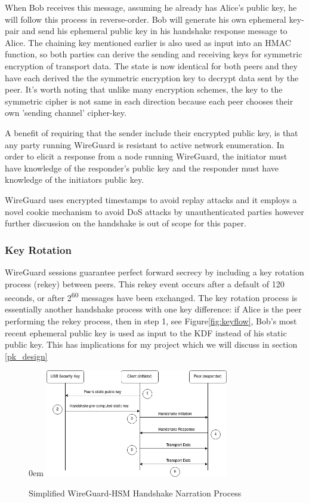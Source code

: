 \documentclass [11pt, proquest] {uwthesis}[2020/02/24]
\begin{document}
When Bob receives this message, assuming he already has Alice's public key, he will follow this process in reverse-order. Bob will generate his own ephemeral key-pair and send his ephemeral public key in his handshake response message to Alice. The chaining key mentioned earlier is also used as input into an HMAC function, so both parties can derive the sending and receiving keys for symmetric encryption of transport data.
The state is now identical for both peers and they have each derived the the symmetric encryption key to decrypt data sent by the peer. It's worth noting that unlike many encryption schemes, the key to the symmetric cipher is not same in each direction because each peer chooses their own 'sending channel' cipher-key.

A benefit of requiring that the sender include their encrypted public key, is that any party running WireGuard is resistant to active network enumeration. In order to elicit a response from a node running WireGuard, the initiator must have knowledge of the responder's public key and the responder must have knowledge of the initiators public key.

WireGuard uses encrypted timestamps to avoid replay attacks and it employs a novel cookie mechanism to avoid DoS attacks by unauthenticated parties however further discussion on the handshake is out of scope for this paper.

\subsubsection{Key Rotation}
\label{keyrotate}
WireGuard sessions guarantee perfect forward secrecy by including a key rotation process (rekey) between peers. This rekey event occurs after a default of 120 seconds, or after 2\textsuperscript{60} messages have been exchanged. The key rotation process is essentially another handshake process with one key difference: if Alice is the peer performing the rekey process, then in step 1, see Figure\ref{fig:keyflow}, Bob's most recent ephemeral public key is used as input to the KDF instead of his static public key. This has implications for my project which we will discuss in section \ref{pk_design}

\begin{figure}
\centering
\itemsep0em 
\includegraphics[width=8cm]{paper/images/Process_Diagram.png}
\caption{Simplified WireGuard-HSM Handshake Narration Process}
\label{fig:handshake_process}
\end{figure}
\end{document}
